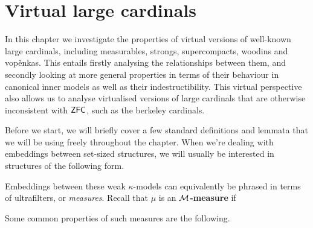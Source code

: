 \documentclass[../../main]{subfiles}
\begin{document}
\chapter{Virtual large cardinals}
\label{chapter.virtual-large-cardinals}
\thispagestyle{fancy}

In this chapter we investigate the properties of virtual versions of well-known large cardinals, including measurables, strongs, supercompacts, woodins and vop\v enkas. This entails firstly analysing the relationships between them, and secondly looking at more general properties in terms of their behaviour in canonical inner models as well as their indestructibility. This virtual perspective also allows us to analyse virtualised versions of large cardinals that are otherwise inconsistent with $\textsf{ZFC}$, such as the berkeley cardinals.

\qquad Before we start, we will briefly cover a few standard definitions and lemmata that we will be using freely throughout the chapter. When we're dealing with embeddings between set-sized structures, we will usually be interested in structures of the following form.


Embeddings between these weak $\kappa$-models can equivalently be phrased in terms of ultrafilters, or \textit{measures}. Recall that $\mu$ is an \textbf{$\operatorname{\mathcal M}$-measure} if

Some common properties of such measures are the following.

\end{document}
